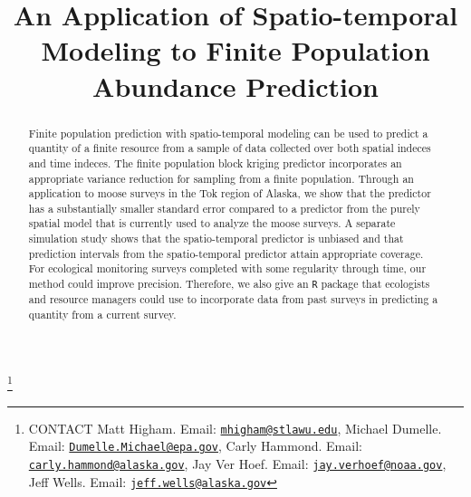 \documentclass[]{interact}
\theoremstyle{plain}%
\theoremstyle{definition}
\theoremstyle{remark}
\begin{document}

\title{An Application of Spatio-temporal Modeling to Finite Population
Abundance Prediction}


\author{
}

\thanks{CONTACT Matt
Higham. Email: \href{mailto:mhigham@stlawu.edu}{\nolinkurl{mhigham@stlawu.edu}}, Michael
Dumelle. Email: \href{mailto:Dumelle.Michael@epa.gov}{\nolinkurl{Dumelle.Michael@epa.gov}}, Carly
Hammond. Email: \href{mailto:carly.hammond@alaska.gov}{\nolinkurl{carly.hammond@alaska.gov}}, Jay
Ver
Hoef. Email: \href{mailto:jay.verhoef@noaa.gov}{\nolinkurl{jay.verhoef@noaa.gov}}, Jeff
Wells. Email: \href{mailto:jeff.wells@alaska.gov}{\nolinkurl{jeff.wells@alaska.gov}}}

\maketitle

\begin{abstract}
Finite population prediction with spatio-temporal modeling can be used
to predict a quantity of a finite resource from a sample of data
collected over both spatial indeces and time indeces. The finite
population block kriging predictor incorporates an appropriate variance
reduction for sampling from a finite population. Through an application
to moose surveys in the Tok region of Alaska, we show that the predictor
has a substantially smaller standard error compared to a predictor from
the purely spatial model that is currently used to analyze the moose
surveys. A separate simulation study shows that the spatio-temporal
predictor is unbiased and that prediction intervals from the
spatio-temporal predictor attain appropriate coverage. For ecological
monitoring surveys completed with some regularity through time, our
method could improve precision. Therefore, we also give an \texttt{R}
package that ecologists and resource managers could use to incorporate
data from past surveys in predicting a quantity from a current survey.
\end{abstract}
\end{document}
